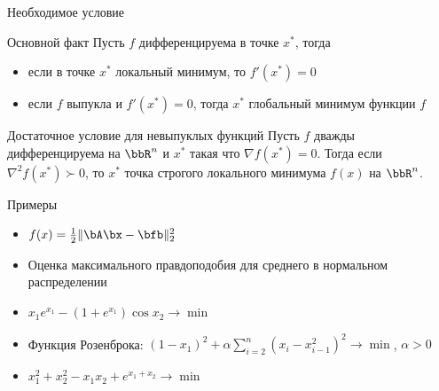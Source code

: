 \documentclass[12pt]{beamer}
\begin{document}
\begin{frame}{Необходимое условие}
\begin{block}{Основной факт}
Пусть $f$ дифференцируема в точке $x^*$, тогда
\begin{itemize}
\item если в точке $x^*$ локальный минимум, то $f'(x^*) = 0$
\item если $f$ выпукла и $f'(x^*) = 0$, тогда $x^*$ глобальный минимум функции $f$
\end{itemize}
\end{block}

\begin{block}{Достаточное условие для невыпуклых функций}
Пусть $f$ дважды дифференцируема на $\bbR^n$ и $x^*$ такая что $\nabla f(x^*) = 0$. 
Тогда если $\nabla^2 f(x^*) \succ 0$, то $x^*$ точка строгого локального минимума $f(x)$ на $\bbR^n$.  
\end{block}

\end{frame}

\begin{frame}{Примеры}
\begin{itemize}[<+->]
\item $f(x) = \frac{1}{2}\|\bA\bx - \bfb\|_2^2$
\item Оценка максимального правдоподобия для среднего в нормальном распределении
\item $x_1e^{x_1} - (1 + e^{x_1})\cos x_2 \rightarrow \min$
\item Функция Розенброка: $(1 - x_1)^2 + \alpha \sum\limits_{i = 2}^n (x_i - x^2_{i-1})^2 \rightarrow \min$, $\alpha > 0$
\item $x^2_1 + x^2_2 - x_1x_2 + e^{x_1 + x_2} \rightarrow \min$
\end{itemize}
\end{frame}
\end{document}
